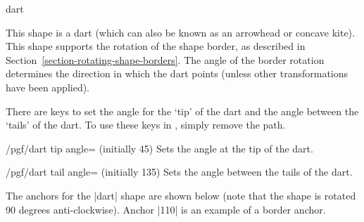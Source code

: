 \begin{shape}{dart}


	This shape is a dart (which can also be known as an arrowhead or
	concave kite). This shape supports the rotation of the shape border,
	as described in Section~\ref{section-rotating-shape-borders}.
	The angle of the border rotation determines the direction in which
	the dart points (unless other transformations have been applied).
	
	There are \pgfname{} keys to set the
	angle for the `tip' of the dart and the angle between the `tails'
	of the dart.
	To use these keys in \tikzname, simply remove the 
	path.

\begin{codeexample}[]
\end{codeexample}

	\begin{key}{/pgf/dart tip angle= (initially 45)}
		Sets the angle at the tip of the dart.
	\end{key}
	
	\begin{key}{/pgf/dart tail angle= (initially 135)}
		Sets the angle between the tails of the dart.
	\end{key}
		
	The anchors for the |dart| shape are shown below (note that the
	shape is rotated 90 degrees anti-clockwise). Anchor |110| is an
	example of a border anchor.
\begin{codeexample}[]
\Huge
{}
\end{codeexample}
\end{shape}




